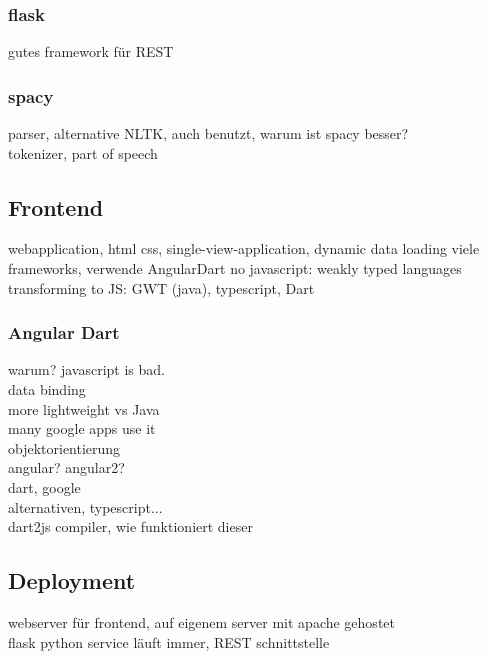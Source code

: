 \subsubsection{flask}
\label{sec:flask}
gutes framework für REST

\subsubsection{spacy}
\label{sec:spacy}
parser, alternative NLTK, auch benutzt, warum ist spacy besser?\\
tokenizer, part of speech

\subsection{Frontend}

webapplication, html css, single-view-application, dynamic data loading
viele frameworks, verwende AngularDart
no javascript: weakly typed languages transforming to JS: GWT (java), typescript, Dart

\subsubsection{Angular Dart}
\label{sec:angulardart}
warum? javascript is bad.\\

data binding\\
more lightweight vs Java\\

many google apps use it\\
objektorientierung\\

angular? angular2?\\

dart, google\\
alternativen, typescript...\\

dart2js compiler, wie funktioniert dieser\\

\subsection{Deployment}

webserver für frontend, auf eigenem server mit apache gehostet\\
flask python service läuft immer, REST schnittstelle\\






